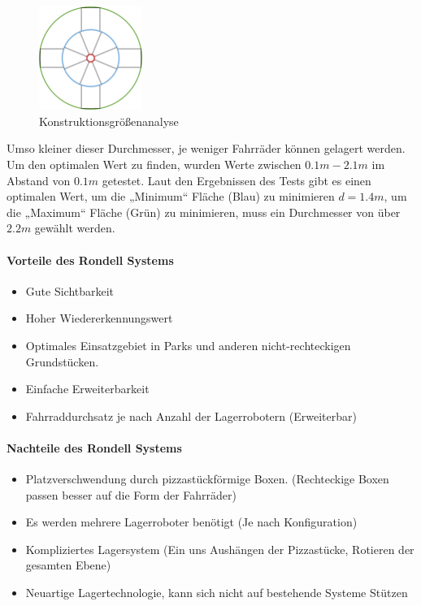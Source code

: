 \begin{figure}[!ht]
  \centering
  \includegraphics[width=0.3\textwidth]{images/konstruktionsgrößen.png}
  \caption{Konstruktionsgrößenanalyse}
  \label{fig:rondell_durchmesser}
\end{figure}

Umso kleiner dieser Durchmesser, je weniger Fahrräder können gelagert werden. Um den optimalen Wert zu finden, wurden Werte zwischen $0.1m-2.1m$ im Abstand von $0.1m$ getestet. Laut den Ergebnissen des Tests gibt es einen optimalen Wert, um die „Minimum“ Fläche (Blau) zu minimieren $d=1.4m$, um die „Maximum“ Fläche (Grün) zu minimieren, muss ein Durchmesser von über $2.2m$ gewählt werden.

\paragraph{Vorteile des Rondell Systems}
\begin{itemize}
  \item Gute Sichtbarkeit
  \item Hoher Wiedererkennungswert
  \item Optimales Einsatzgebiet in Parks und anderen nicht-rechteckigen Grundstücken.
  \item Einfache Erweiterbarkeit
  \item Fahrraddurchsatz je nach Anzahl der Lagerrobotern (Erweiterbar)
\end{itemize}

\paragraph{Nachteile des Rondell Systems}
\begin{itemize}
  \item Platzverschwendung durch pizzastückförmige Boxen. (Rechteckige Boxen passen besser auf die Form der Fahrräder)
  \item Es werden mehrere Lagerroboter benötigt (Je nach Konfiguration)
  \item Kompliziertes Lagersystem (Ein uns Aushängen der Pizzastücke, Rotieren der gesamten Ebene)
  \item Neuartige Lagertechnologie, kann sich nicht auf bestehende Systeme Stützen
\end{itemize}
